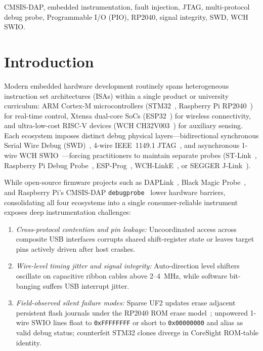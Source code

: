 \documentclass[journal]{IEEEtran}
\begin{document}
\begin{IEEEkeywords}
CMSIS-DAP, embedded instrumentation, fault injection, JTAG, multi-protocol debug probe, Programmable I/O (PIO), RP2040, signal integrity, SWD, WCH SWIO.
\end{IEEEkeywords}

\section{Introduction}
\label{sec:intro}
Modern embedded hardware development routinely spans heterogeneous instruction set architectures (ISAs) within a single product or university curriculum: ARM Cortex-M microcontrollers (STM32~\cite{st_stm32f1_rm,st_stm32f4_rm}, Raspberry Pi RP2040~\cite{rpi_rp2040_ds}) for real-time control, Xtensa dual-core SoCs (ESP32~\cite{espressif_esp32_trm}) for wireless connectivity, and ultra-low-cost RISC-V devices (WCH CH32V003~\cite{wch_ch32v003_rm}) for auxiliary sensing. Each ecosystem imposes distinct debug physical layers—bidirectional synchronous Serial Wire Debug (SWD)~\cite{arm_adiv5}, 4-wire IEEE~1149.1 JTAG~\cite{ieee_1149_1}, and asynchronous 1-wire WCH SWIO~\cite{wch_ch32v003_rm,riscv_debug_spec}—forcing practitioners to maintain separate probes (ST-Link~\cite{st_stlink_v3}, Raspberry Pi Debug Probe~\cite{rpi_debugprobe}, ESP-Prog~\cite{espressif_espprog}, WCH-LinkE~\cite{wch_linke}, or SEGGER J-Link~\cite{segger_jlink}).

While open-source firmware projects such as DAPLink~\cite{arm_daplink}, Black Magic Probe~\cite{blackmagic_probe}, and Raspberry Pi's CMSIS-DAP \texttt{debugprobe}~\cite{rpi_debugprobe} lower hardware barriers, consolidating all four ecosystems into a single consumer-reliable instrument exposes deep instrumentation challenges:
\begin{enumerate}
  \item \emph{Cross-protocol contention and pin leakage:} Uncoordinated access across composite USB interfaces corrupts shared shift-register state or leaves target pins actively driven after host crashes.
  \item \emph{Wire-level timing jitter and signal integrity:} Auto-direction level shifters oscillate on capacitive ribbon cables above 2--4~MHz, while software bit-banging suffers USB interrupt jitter.
  \item \emph{Field-observed silent failure modes:} Sparse UF2 updates erase adjacent persistent flash journals under the RP2040 ROM erase model~\cite{ms_uf2_spec}; unpowered 1-wire SWIO lines float to \texttt{0xFFFFFFFF} or short to \texttt{0x00000000} and alias as valid debug status; counterfeit STM32 clones diverge in CoreSight ROM-table identity.
\end{enumerate}
\end{document}
